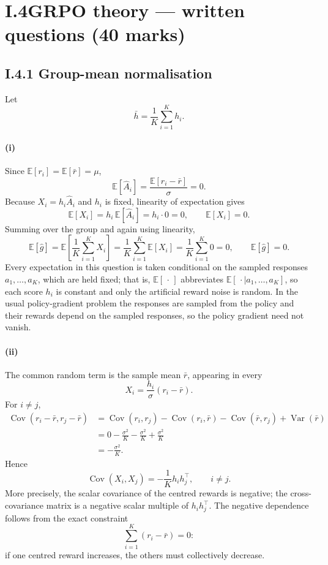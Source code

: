 \documentclass[11pt]{article}
\begin{document}
\clearpage
\section*{I.4\quad GRPO theory --- written questions (40 marks)}

\subsection*{I.4.1 Group-mean normalisation}

Let
\[
\bar h=\frac{1}{K}\sum_{i=1}^K h_i.
\]

\paragraph{(i)}
Since $\mathbb{E}[r_i]=\mathbb{E}[\bar r]=\mu$,
\[
\mathbb{E}[\hat A_i]
=
\frac{\mathbb{E}[r_i-\bar r]}{\sigma}
=0.
\]
Because $X_i=h_i\hat A_i$ and $h_i$ is fixed, linearity of expectation gives
\[
\mathbb{E}[X_i]
=
h_i\,\mathbb{E}[\hat A_i]
=
h_i\cdot 0
=0,
\qquad
\mathbb{E}[X_i]=0.
\]
Summing over the group and again using linearity,
\[
\mathbb{E}[\hat g]
=
\mathbb{E}\!\left[\frac{1}{K}\sum_{i=1}^K X_i\right]
=
\frac{1}{K}\sum_{i=1}^K\mathbb{E}[X_i]
=
\frac{1}{K}\sum_{i=1}^K 0
=0,
\qquad
\mathbb{E}[\hat g]=0.
\]
Every expectation in this question is taken conditional on the sampled
responses $a_1,\dots,a_K$, which are held fixed; that is, $\mathbb{E}[\,\cdot\,]$
abbreviates $\mathbb{E}[\,\cdot\mid a_1,\dots,a_K]$, so each score $h_i$ is
constant and only the artificial reward noise is random. In the usual
policy-gradient problem the responses are sampled from the policy and their
rewards depend on the sampled responses, so the policy gradient need not vanish.

\paragraph{(ii)}
The common random term is the sample mean $\bar r$, appearing in every
\[
X_i=\frac{h_i}{\sigma}(r_i-\bar r).
\]
For $i\neq j$,
\begin{align*}
\operatorname{Cov}(r_i-\bar r,r_j-\bar r)
&=
\operatorname{Cov}(r_i,r_j)
-\operatorname{Cov}(r_i,\bar r)
-\operatorname{Cov}(\bar r,r_j)
+\operatorname{Var}(\bar r)\\
&=
0-\frac{\sigma^2}{K}-\frac{\sigma^2}{K}
+\frac{\sigma^2}{K}\\
&=
-\frac{\sigma^2}{K}.
\end{align*}
Hence
\[
\operatorname{Cov}(X_i,X_j)
=
-\frac{1}{K}h_i h_j^\top,
\qquad i\neq j.
\]
More precisely, the scalar covariance of the centred rewards is negative; the
cross-covariance matrix is a negative scalar multiple of $h_i h_j^\top$.
The negative dependence follows from the exact constraint
\[
\sum_{i=1}^K(r_i-\bar r)=0:
\]
if one centred reward increases, the others must collectively decrease.
\end{document}
